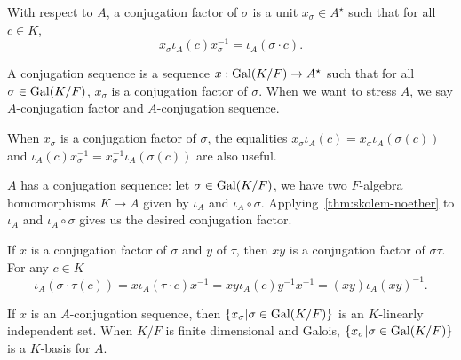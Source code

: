\begin{definition}
  \label{def:conj-factor}
  With respect to $A$, a conjugation factor of $\sigma$ is a unit $x_{\sigma} \in A^{\star}$ such that for all $c \in K$,
  \[
    x_{\sigma} \iota_{A}(c)x_{\sigma}^{-1} = \iota_{A}(\sigma \cdot c).
  \]

  A conjugation sequence is a sequence $x:\operatorname{Gal}(K/F) \to A^{\star}$ such that for all $\sigma\in\operatorname{Gal}(K/F)$, $x_{\sigma}$ is a conjugation factor of $\sigma$. When we want to stress $A$, we say $A$-conjugation factor and $A$-conjugation sequence.
  \leanok
\end{definition}

\begin{remark}\label{rem:conj-factor-alternative-eq}
  When $x_{\sigma}$ is a conjugation factor of $\sigma$, the equalities $x_{\sigma}\iota_{A}(c) = x_{\sigma}\iota_{A}(\sigma(c))$ and $\iota_{A}(c)x_{\sigma}^{-1}=x_{\sigma}^{-1}\iota_{A}(\sigma(c))$ are also useful.
\end{remark}

\begin{construction}\label{con:exists-conj-seq}
  $A$ has a conjugation sequence:
  let $\sigma \in \operatorname{Gal}(K/F)$, we have two $F$-algebra homomorphisms $K \to A$ given by $\iota_{A}$ and $\iota_{A}\circ \sigma$. Applying~\cref{thm:skolem-noether} to $\iota_{A}$ and $\iota_{A}\circ \sigma$ gives us the desired conjugation factor.
  \leanok
\end{construction}

\begin{construction}
  If $x$ is a conjugation factor of $\sigma$ and $y$ of $\tau$, then $xy$ is a conjugation factor of $\sigma\tau$. For any $c \in K$
  \[
    \iota_{A}(\sigma \cdot\tau(c)) = x\iota_{A}(\tau\cdot c)x^{-1} = xy\iota_{A}(c)y^{-1}x^{-1}=\left(xy\right)\iota_{A}{\left(xy\right)}^{-1}.
  \]
  \leanok
\end{construction}

\begin{theorem}\label{thm:conj-seq-basis}
  If $x$ is an $A$-conjugation sequence, then $\{x_{\sigma}|\sigma\in \operatorname{Gal}(K/F)\}$ is an $K$-linearly independent set. When $K/F$ is finite dimensional and Galois, $\{x_{\sigma}|\sigma\in \operatorname{Gal}(K/F)\}$ is a $K$-basis for $A$.
  \leanok
\end{theorem}

